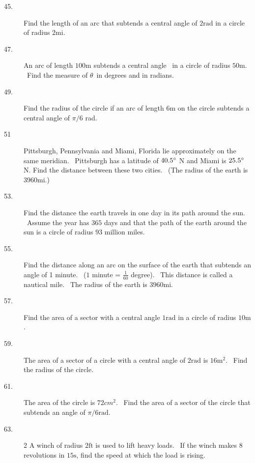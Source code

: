 \begin{description}
\item [45.]
Find the length of an arc that subtends a central angle of $2 \mbox{rad}$ in a circle of radius 2mi. 

\item [47.]
An arc of length $100 \mbox{m}$ subtends a central angle \ in
a circle of radius $50 \mbox{m}$. \ Find the measure of $\theta $\ in degrees and in radians. 

\item [49.]
Find the radius of the circle if an arc of length $6 \mbox{m}$ on the circle subtends a central angle of $\pi /6$ rad. 

\item [51] Pittsburgh, Pennsylvania
and Miami, Florida lie approximately on the same meridian. \ Pittsburgh has a latitude of $40.5 \mbox{{\ensuremath{{}^\circ}}}$ N and Miami is $25.5 \mbox{{\ensuremath{{}^\circ}}}$ N. Find the distance between these two cities. \ (The
radius of the earth is $3960 \mbox{mi}\text{.}$) 

\item [53.] Find the distance
the earth travels in one day in its path around the sun. \ Assume the year has $365$ days and that the path of the earth around the sun is a circle of radius $93$ million miles. 

\item [55.] Find
the distance along an arc on the surface of the earth that subtends an angle of 1 minute. \ ($1$ minute = $\frac{1}{60}$ degree). \ This distance is called a nautical mile. \ The
radius of the earth is $3960 \mbox{mi}\text{.}$ 

\item [57.] Find the area
of a sector with a central angle $1 \mbox{rad}$ in a circle of radius $10 \mbox{m}$. 

\item [59.]
The area of a sector of a circle with a central angle of $2 \mbox{rad}$ is $16 \mathrm{m}^{2}$. \ Find the radius of the circle. 

\item [61.]
The area of the circle is $72 cm^{2}$. \ Find the area of a sector of the circle that subtends an angle of $\pi /6 \mbox{rad}\text{.}$ 

\item [63.]   
\columnsep =30pt
\begin {multicols}{2}
 A winch of radius $2 \mbox{ft}$ is used to lift heavy loads. \ If the winch makes
$8$ revolutions in $15 \mbox{s}$, find the speed at which the load is rising. 


\end{multicols}
\end{description}
